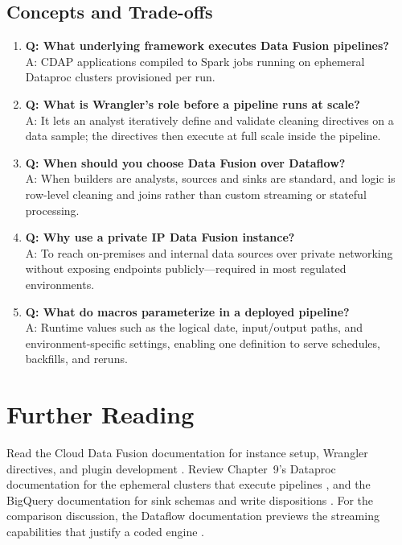 \subsection{Concepts and Trade-offs}
\begin{enumerate}
    \item \textbf{Q: What underlying framework executes Data Fusion pipelines?}\\
    A: CDAP applications compiled to Spark jobs running on ephemeral Dataproc clusters provisioned per run.

    \item \textbf{Q: What is Wrangler's role before a pipeline runs at scale?}\\
    A: It lets an analyst iteratively define and validate cleaning directives on a data sample; the directives then execute at full scale inside the pipeline.

    \item \textbf{Q: When should you choose Data Fusion over Dataflow?}\\
    A: When builders are analysts, sources and sinks are standard, and logic is row-level cleaning and joins rather than custom streaming or stateful processing.

    \item \textbf{Q: Why use a private IP Data Fusion instance?}\\
    A: To reach on-premises and internal data sources over private networking without exposing endpoints publicly---required in most regulated environments.

    \item \textbf{Q: What do macros parameterize in a deployed pipeline?}\\
    A: Runtime values such as the logical date, input/output paths, and environment-specific settings, enabling one definition to serve schedules, backfills, and reruns.
\end{enumerate}

\section{Further Reading}
Read the Cloud Data Fusion documentation for instance setup, Wrangler directives, and plugin development \cite{googleclouddatafusiondocs}. Review Chapter~9's Dataproc documentation for the ephemeral clusters that execute pipelines \cite{googleclouddataprocdocs}, and the BigQuery documentation for sink schemas and write dispositions \cite{googlecloudbigquerydocs}. For the comparison discussion, the Dataflow documentation previews the streaming capabilities that justify a coded engine \cite{googleclouddataflowdocs}.

